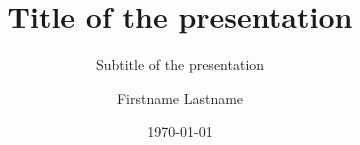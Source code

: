 
\newcommand{\myauthor}{Firstname Lastname}
\newcommand{\role}{Role}
\newcommand{\phone}{Phone}
\newcommand{\myemail}{Email}
\newcommand{\email}{\href{mailto:\myemail}{\myemail}}

\title{Title of the presentation}
\subtitle{Subtitle of the presentation}
\author{\myauthor}
\date{\today}

\subject{}
\keywords{}